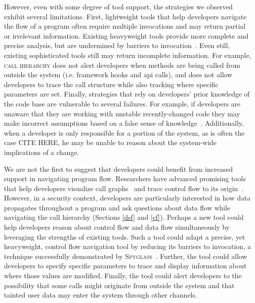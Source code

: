 \documentclass{acm_proc_article-sp}
\begin{document}
However, even with some degree of tool support, the strategies we observed exhibit several limitations. 
First, lightweight tools that help developers navigate the flow of a program often require multiple invocations and may return partial or irrelevant information. 
Existing heavyweight tools provide more complete and precise analysis, but are undermined by barriers to invocation~\cite{johnson2013don}. 
Even still, existing sophisticated tools still may return incomplete information. 
For example, \textsc{call hierarchy} does not alert developers when methods are being called from outside the system (i.e. framework hooks and api calls), and does not allow developers to trace the call structure while also tracking where specific parameters are set.
Finally, strategies that rely on developers' prior knowledge of the code base are vulnerable to several failures. 
For example, if developers are unaware that they are working with unstable recently-changed code they may make incorrect assumptions based on a false sense of knowledge~\cite{fritz2014degree}. 
Additionally, when a developer is only responsible for a portion of the system, as is often the case CITE HERE, he may be unable to reason about the system-wide implications of a change. 

We are not the first to suggest that developers could benefit from increased support in navigating program flow. 
Researchers have advanced promising tools that help developers visualize call graphs~\cite{latoza2011visualizing} and trace control flow to its origin~\cite{barnett2014getMeHere}.
However, in a security context, developers are particularly interested in how data propagates throughout a program and ask questions about data flow while navigating the call hierarchy (Sections \ref{dsf} and \ref{cf}).
Perhaps a new tool could help developers reason about control flow and data flow simultaneously by leveraging the strengths of existing tools.
Such a tool could adapt a precise, yet heavyweight, control flow navigation tool by reducing its barriers to invocation, a technique successfully demonstrated by \textsc{Spyglass}~\cite{viriyakattiyaporn2010spyglass}.
Further, the tool could allow developers to specify specific parameters to trace and display information about where those values are modified.
Finally, the tool could alert developers to the possibility that some calls might originate from outside the system and that tainted user data may enter the system through other channels.
\end{document}
